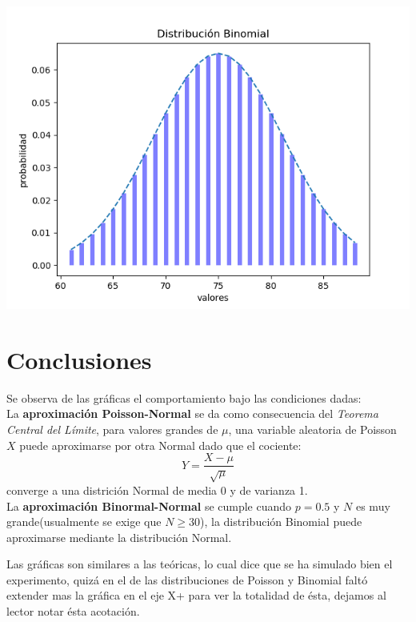 \documentclass[12pt,a4paper]{article}
\begin{document}
\begin{multicols}{2}
\begin{itemize}
        \includegraphics[scale=0.5]{binomial_normal_4.png}
    \end{itemize}
\section{Conclusiones}
    Se observa de las gráficas el comportamiento bajo las condiciones dadas:\\
    La \textbf{aproximación Poisson-Normal} se da como consecuencia del \textit{Teorema Central del Límite}, para valores grandes de $\mu$, una variable aleatoria de Poisson $X$ puede aproximarse por otra Normal dado que el cociente:
    $$Y=\frac{X-\mu}{\sqrt{\mu}}$$
    converge a una districión Normal de media 0 y de varianza 1.\\
    La \textbf{aproximación Binormal-Normal} se cumple cuando $p=0.5$ y $N$ es muy grande(usualmente se exige que $N\geq30$), la distribución Binomial puede aproximarse mediante la distribución Normal.
    
    Las gráficas son similares a las teóricas, lo cual dice que se ha simulado bien el experimento, quizá en el de las distribuciones de Poisson y Binomial faltó extender mas la gráfica en el eje X+ para ver la totalidad de ésta, dejamos al lector notar ésta acotación. 

\end{multicols}
\end{document}
